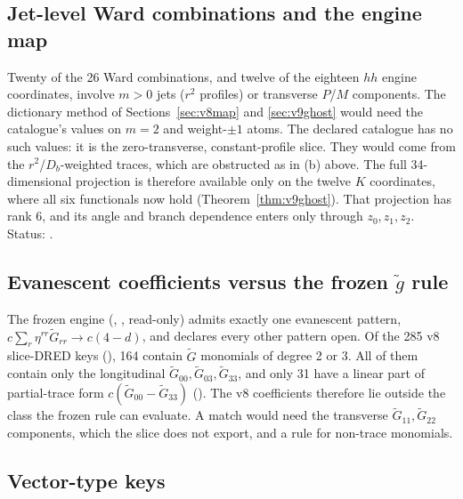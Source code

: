 \subsection{Jet-level Ward combinations and the engine map}
\label{sec:v9jet}

Twenty of the 26 Ward combinations, and twelve of the eighteen
\(hh\) engine coordinates, involve \(m>0\) jets (\(r^2\) profiles)
or transverse \(P\)/\(M\) components. The dictionary method of
Sections~\ref{sec:v8map} and \ref{sec:v9ghost} would need the
catalogue's values on \(m=2\) and weight-\(\pm1\) atoms. The
declared catalogue has no such values: it is the zero-transverse,
constant-profile slice. They would come from the
\(r^2\)/\(D_b\)-weighted traces, which are obstructed as in (b)
above. The full 34-dimensional projection is therefore available
only on the twelve \(K\) coordinates, where all six functionals now
hold (Theorem~\ref{thm:v9ghost}). That projection has rank 6, and
its angle and branch dependence enters only through \(z_0,z_1,z_2\).
Status: \OPEN.

\subsection{Evanescent coefficients versus the frozen \texorpdfstring{\(\tilde g\)}{g-tilde} rule}

\begin{proposition}
\label{prop:v9evan}
The frozen engine (,
, read-only) admits exactly one evanescent
pattern, \(c\sum_r\eta^{rr}\tilde G_{rr}\to c(4-d)\), and declares
every other pattern open. Of the 285 v8 slice-DRED keys
(), 164 contain
\(\tilde G\) monomials of degree 2 or 3. All of them contain only
the longitudinal \(\tilde G_{00},\tilde G_{03},\tilde G_{33}\), and
only 31 have a linear part of partial-trace form
\(c(\tilde G_{00}-\tilde G_{33})\)
(). The v8 coefficients therefore lie
outside the class the frozen rule can evaluate. A match would need
the transverse \(\tilde G_{11},\tilde G_{22}\) components, which
the slice does not export, and a rule for non-trace monomials.
\end{proposition}

\subsection{Vector-type keys}

